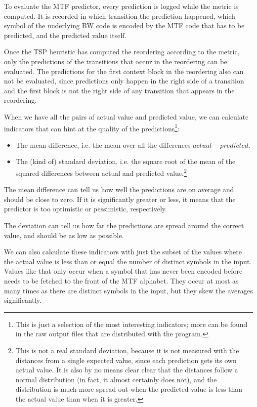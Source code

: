 \documentclass[a4paper]{scrreprt}
\begin{document}
To evaluate the MTF predictor, every prediction is logged while the metric is
computed. It is recorded in which transition the prediction happened, which
symbol of the underlying BW code is encoded by the MTF code that has to be
predicted, and the predicted value itself.

Once the TSP heuristic has computed the reordering according to the metric,
only the predictions of the transitions that occur in the reordering can be
evaluated. The predictions for the first context block in the reordering also
can not be evaluated, since predictions only happen in the right side of a
transition and the first block is not the right side of any transition that
appears in the reordering.

When we have all the pairs of actual value and predicted value, we can calculate
indicators that can hint at the quality of the predictions\footnote{This is
just a selection of the most interesting indicators; more can be found in the
raw output files that are distributed with the program.}:
\begin{itemize}
  \item The mean difference, i.e. the mean over all the differences \(actual -
  predicted\).
  \item The (kind of) standard deviation, i.e. the square root of the mean of
  the squared differences between actual and predicted value.\footnote{This is
  not a real standard deviation, because it is not measured with the distances
  from a single expected value, since each prediction gets its own actual 
  value. It is also by no means clear clear that the distances follow a normal
  distribution (in fact, it almost certainly does not), and the distribution is
  much more spread out when the predicted value is less than the actual value
  than when it is greater.}
\end{itemize}

The mean difference can tell us how well the predictions are on average and
should be close to zero. If it is significantly greater or less, it means that
the predictor is too optimistic or pessimistic, respectively.

The deviation can tell us how far the predictions are spread around the correct
value, and should be as low as possible.

We can also calculate these indicators with just the subset of the values where
the actual value is less than or equal the number of distinct symbols in the
input. Values like that only occur when a symbol that has never been encoded
before needs to be fetched to the front of the MTF alphabet. They occur at most
as many times as there are distinct symbols in the input, but they skew the
averages significantly.
\end{document}
